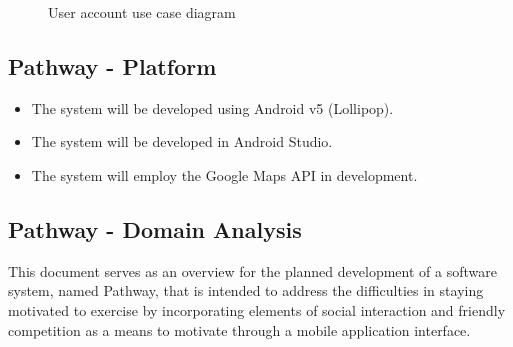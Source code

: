\documentclass{article}
\begin{document}
\begin{figure}[H]
    \centering
    \begin{center}
    \end{center}
    \caption{User account use case diagram}
    \label{fig:my_label}
\end{figure}

\newpage

\subsection{Pathway - Platform}
\begin{itemize}
    \item The system will be developed using Android v5 (Lollipop).
    \item The system will be developed in Android Studio.
    \item The system will employ the Google Maps API in development.
\end{itemize}

\subsection{Pathway - Domain Analysis}
This document serves as an overview for the planned development of a software system, named Pathway, that is intended to address the difficulties in staying motivated to exercise by incorporating elements of social interaction and friendly competition as a means to motivate through a mobile application interface.
\end{document}
